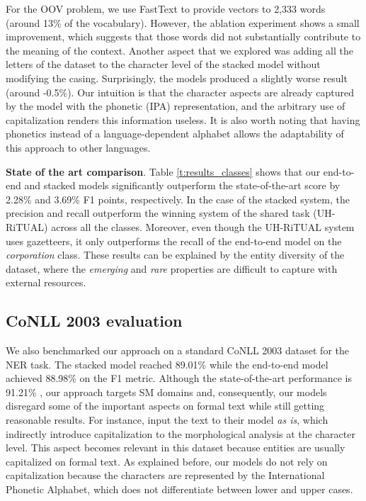 \documentclass[11pt,a4paper]{article}
\begin{document}
For the OOV problem, we use FastText to provide vectors to 2,333 words (around 13\% of the vocabulary). However, the ablation experiment shows a small improvement, which suggests that those words did not substantially contribute to the meaning of the context. Another aspect that we explored was adding all the letters of the dataset to the character level of the stacked model without modifying the casing. Surprisingly, the models produced a slightly worse result (around -0.5\%). Our intuition is that the character aspects are already captured by the model with the phonetic (IPA) representation, and the arbitrary use of capitalization renders this information useless. It is also worth noting that having phonetics instead of a language-dependent alphabet allows the adaptability of this approach to other languages.

\noindent \textbf{State of the art comparison}. Table \ref{t:results_classes} shows that our end-to-end and stacked models significantly outperform the state-of-the-art score by 2.28\% and 3.69\% F1 points, respectively. In the case of the stacked system, the precision and recall outperform the winning system of the shared task (UH-RiTUAL) across all the classes. Moreover, even though the UH-RiTUAL system uses gazetteers, it only outperforms the recall of the end-to-end model on the \textit{corporation} class. These results can be explained by the entity diversity of the dataset, where the \textit{emerging} and \textit{rare} properties are difficult to capture with external resources.

\subsection{CoNLL 2003 evaluation}

We also benchmarked our approach on a standard CoNLL 2003 dataset for the NER task. The stacked model reached 89.01\% while the end-to-end model achieved 88.98\% on the F1 metric. Although the state-of-the-art performance is 91.21\% \citep{MaAndHovy:16}, our approach targets SM domains and, consequently, our models disregard some of the important aspects on formal text while still getting reasonable results. For instance, \citet{MaAndHovy:16} input the text to their model \textit{as is}, which indirectly introduce capitalization to the morphological analysis at the character level. This aspect becomes relevant in this dataset because entities are usually capitalized on formal text. As explained before, our models do not rely on capitalization because the characters are represented by the International Phonetic Alphabet, which does not differentiate between lower and upper cases.
\end{document}
